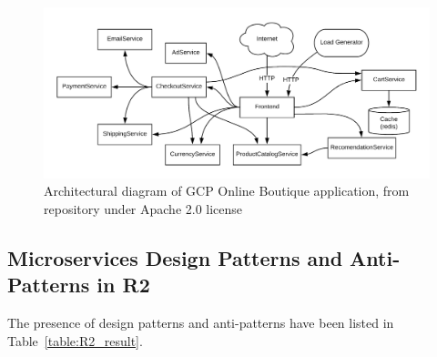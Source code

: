\documentclass{Configuration_Files/PoliMi3i_thesis}
\begin{document}
\begin{figure}[H]
\centering
\includegraphics[width=1\textwidth]{myImages/R2.png}
\caption{Architectural diagram of GCP Online Boutique application, from repository under Apache 2.0 license}
\label{fig:R2_arch}
\end{figure}

\subsection{Microservices Design Patterns and Anti-Patterns in R2}
\label{subsec:R2_detection}

The presence of design patterns and anti-patterns have been listed in Table~\ref{table:R2_result}.
\end{document}

